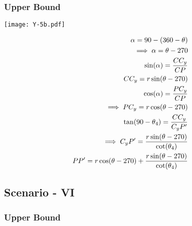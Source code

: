 \subsubsection{Upper Bound}

\begin{minipage}[t]{0.5\textwidth}
\texttt{[image: Y-5b.pdf]}  
\end{minipage}
\begin{minipage}[t]{0.5\textwidth}
\vspace{-2in}
\begin{equation*}
\centering
\begin{aligned}
\alpha = 90 - (360 - \theta)\\
\implies \alpha = \theta - 270 \\
\sin(\alpha) = \frac{CC_y}{CP}\\
CC_y = r\sin(\theta - 270)\\
\cos(\alpha) = \frac{PC_y}{CP}\\
\implies PC_y = r\cos(\theta - 270)\\
\tan(90 - \theta_4) = \frac{CC_y}{C_{y}P'}\\
\implies C_{y}P' = \frac{r\sin(\theta - 270)}{\cot(\theta_4)}\\
PP' = r\cos(\theta - 270) +  \frac{r\sin(\theta - 270)}{\cot(\theta_4)}
\end{aligned}
\end{equation*}
\end{minipage}






\subsection{Scenario - VI}

\subsubsection{Upper Bound}

